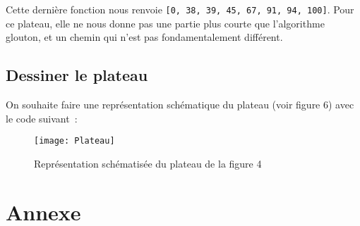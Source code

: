 Cette dernière fonction nous renvoie \texttt{[0, 38, 39, 45, 67, 91, 94, 100]}. Pour ce plateau, elle ne nous donne pas une partie plus courte que l'algorithme glouton, et un chemin qui n'est pas fondamentalement différent.

\subsection*{Dessiner le plateau}

On souhaite faire une représentation schématique du plateau (voir figure 6) avec le code suivant~: 

\noindent

\begin{figure}[h]
	\begin{center}
		\texttt{[image: Plateau]}
	\end{center}
	\caption{Représentation schématisée du plateau de la figure 4}
	\label{fig:2}
\end{figure}


%	








\section*{Annexe}

